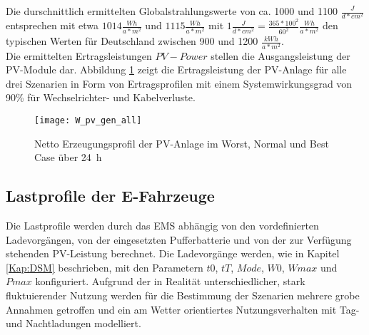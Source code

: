 			Die durschnittlich ermittelten Globalstrahlungswerte von ca. 1000 und 1100 $\frac{J}{d*cm^2}$ entsprechen mit etwa $1014\frac{Wh}{a*m^2}$ und $1115\frac{Wh}{a*m^2}$ mit $1\frac{J}{d*cm^2} = \frac{365*100^2}{60^2}\frac{Wh}{a*m^2}$ den typischen Werten für Deutschland zwischen 900 und 1200 $\frac{kWh}{a*m^2}$. \cite{DWD} \\
            
            Die ermittelten Ertragsleistungen $PV-Power$ stellen die Ausgangsleistung der PV-Module dar. Abbildung \ref{Abb:PV_gen} zeigt die Ertragsleistung der PV-Anlage für alle drei Szenarien in Form von Ertragsprofilen mit einem Systemwirkungsgrad von 90\% für Wechselrichter- und Kabelverluste. 

					\begin{figure}[h] %
						\centering
						\texttt{[image: W\_pv\_gen\_all]}
						\caption{Netto Erzeugungsprofil der PV-Anlage im Worst, Normal und Best Case über 24~h}
						\label{Abb:PV_gen}
					\end{figure}
			
			
				

	
	\subsection{Lastprofile der E-Fahrzeuge}
	\label{Kap:Sim_cfg_con}
		Die Lastprofile werden durch das EMS abhängig von den vordefinierten Ladevorgängen, von der eingesetzten Pufferbatterie und von der zur Verfügung stehenden PV-Leistung berechnet. Die Ladevorgänge werden, wie in Kapitel \ref{Kap:DSM} beschrieben, mit den Parametern $t0$, $tT$, $Mode$, $W0$, $Wmax$ und $Pmax$ konfiguriert. Aufgrund der in Realität unterschiedlicher, stark fluktuierender Nutzung werden für die Bestimmung der Szenarien mehrere grobe Annahmen getroffen und ein am Wetter orientiertes Nutzungsverhalten mit Tag- und Nachtladungen modelliert. \\
        
